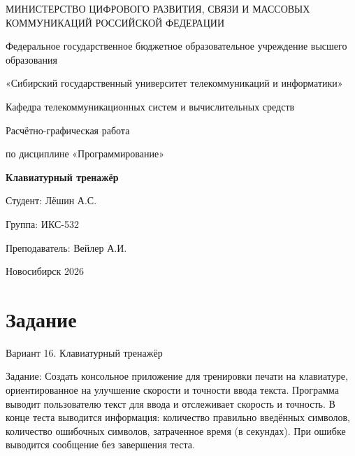 \documentclass[a4paper,14pt,oneside,openany]{memoir}
\begin{document}
\thispagestyle{empty}

\begin{center}
МИНИСТЕРСТВО ЦИФРОВОГО РАЗВИТИЯ, СВЯЗИ И МАССОВЫХ КОММУНИКАЦИЙ РОССИЙСКОЙ ФЕДЕРАЦИИ

\vspace{20pt}

Федеральное государственное бюджетное образовательное учреждение высшего образования

\vspace{10pt}

«Сибирский государственный университет телекоммуникаций и информатики»

\vspace{20pt}

Кафедра телекоммуникационных систем и вычислительных средств
\end{center}

\vfill

\begin{center}
Расчётно-графическая работа

по дисциплине «Программирование»

\vspace{20pt}

\textbf{Клавиатурный тренажёр}
\end{center}

\vfill

\noindent Студент: \hfill Лёшин А.С.  

\vspace{10pt}

\noindent Группа: \hfill ИКС-532  

\vspace{10pt}

\noindent Преподаватель: \hfill Вейлер А.И.  

\vfill

\begin{center}
Новосибирск 2026
\end{center}

\newpage
\setcounter{page}{2}
\OnehalfSpacing*

\chapter{Задание}

Вариант 16. Клавиатурный тренажёр

Задание: Создать консольное приложение для тренировки печати на клавиатуре,
ориентированное на улучшение скорости и точности ввода текста. Программа выводит
пользователю текст для ввода и отслеживает скорость и точность. В конце теста
выводится информация: количество правильно введённых символов, количество
ошибочных символов, затраченное время (в секундах). При ошибке выводится сообщение
без завершения теста.
\end{document}
